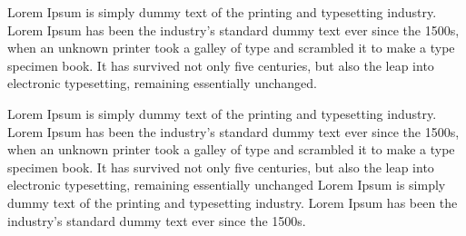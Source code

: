 Lorem Ipsum is simply dummy text of the printing and typesetting industry. Lorem Ipsum has been the industry's standard dummy text ever since the 1500s, when an unknown printer took a galley of type and scrambled it to make a type specimen book. It has survived not only five centuries, but also the leap into electronic typesetting, remaining essentially unchanged.

Lorem Ipsum is simply dummy text of the printing and typesetting industry. Lorem Ipsum has been the industry's standard dummy text ever since the 1500s, when an unknown printer took a galley of type and scrambled it to make a type specimen book. It has survived not only five centuries, but also the leap into electronic typesetting, remaining essentially unchanged Lorem Ipsum is simply dummy text of the printing and typesetting industry. Lorem Ipsum has been the industry's standard dummy text ever since the 1500s.
